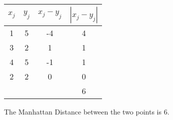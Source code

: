 \begin{center}
\begin{tabular}{|c|c|c|c|}
  \hline
$x_j$	&	$y_j$	&   $x_j - y_j$	&	$| x_j - y_j |$	\\ \hline
1	&	5	&	-4	&	4	\\
3	&	2	&	1	&	1	\\
4	&	5	&	-1	&	1	\\
2	&	2	&	0	&	0	\\ \hline
& & & 6 \\
  \hline
\end{tabular}
\end{center}
The Manhattan Distance between the two points is 6.

